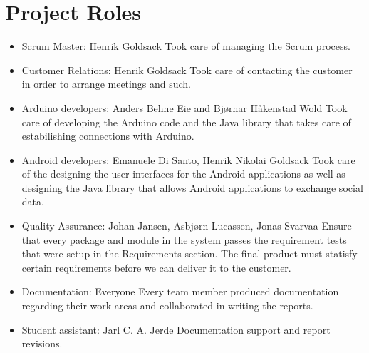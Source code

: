 \section{Project Roles}
\begin{itemize}
	\item{Scrum Master:} Henrik Goldsack\newline
	Took care of managing the Scrum process.
	
	\item{Customer Relations:} Henrik Goldsack\newline
	Took care of contacting the customer in order to arrange meetings and such.

	\item{Arduino developers:} Anders Behne Eie and Bjørnar Håkenstad Wold\newline
	Took care of developing the Arduino code and the Java library that takes
	care of estabilishing connections with Arduino.

	\item{Android developers:} Emanuele Di Santo, Henrik Nikolai Goldsack\newline
	Took care of the designing the user interfaces for the Android applications
	as well as designing the Java library that allows Android applications
	to exchange social data.
	
	\item{Quality Assurance:} Johan Jansen, Asbjørn Lucassen, Jonas Svarvaa\newline
	Ensure that every package and module in the system passes the requirement tests
	that were setup in the Requirements section. The final product must statisfy certain
	requirements before we can deliver it to the customer.

	\item{Documentation:} Everyone\newline
	Every team member produced documentation regarding their work areas and
	collaborated in writing the reports.

	\item{Student assistant:} Jarl C. A. Jerde \newline
	Documentation support and report revisions.
\end{itemize}

